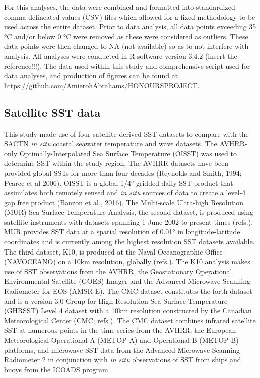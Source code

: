 \documentclass[12pt,A4paper,]{article}
\begin{document}
For this analyses, the data were combined and formatted into
standardized comma delineated values (CSV) files which allowed for a
fixed methodology to be used across the entire dataset. Prior to data
analysis, all data points exceeding 35 °C and/or below 0 °C were removed
as these were considered as outliers. These data points were then
changed to NA (not available) so as to not interfere with analysis. All
analyses were conducted in R software version 3.4.2 (insert the
reference!!!). The data used within this study and comprehensive script
used for data analyses, and production of figures can be found at
\url{https://github.com/AmierohAbrahams/HONOURSPROJECT}.

\subsection{Satellite SST data}\label{satellite-sst-data}

This study made use of four satellite-derived SST datasets to compare
with the SACTN \emph{in situ} coastal seawater temperature and wave
datasets. The AVHRR-only Optimally-Interpolated Sea Surface Temperature
(OISST) was used to determine SST within the study region. The AVHRR
datasets have been provided global SSTs for more than four decades
(Reynolds and Smith, 1994; Pearce et al 2006). OISST is a global 1/4°
gridded daily SST product that assimilates both remotely sensed and
\emph{in situ} sources of data to create a level-4 gap free product
(Banzon et al., 2016). The Multi-scale Ultra-high Resolution (MUR) Sea
Surface Temperature Analysis, the second dataset, is produced using
satellite instruments with datasets spanning 1 June 2002 to present
times (refs.). MUR provides SST data at a spatial resolution of 0.01° in
longitude-latitude coordinates and is currently among the highest
resolution SST datasets available. The third dataset, K10, is produced
at the Naval Oceanographic Office (NAVOCEANO) on a 10km resolution,
globally (refs.). The K10 analysis makes use of SST observations from
the AVHRR, the Geostationary Operational Environmental Satellite (GOES)
Imager and the Advanced Microwave Scanning Radiometer for EOS (AMSR-E).
The CMC dataset constitutes the forth dataset and is a version 3.0 Group
for High Resolution Sea Surface Temperature (GHRSST) Level 4 dataset
with a 10km resolution constructed by the Canadian Meteorological Center
(CMC; refs.). The CMC dataset combines infrared satellite SST at
numerous points in the time series from the AVHRR, the European
Meteorological Operational-A (METOP-A) and Operational-B (METOP-B)
platforms, and microwave SST data from the Advanced Microwave Scanning
Radiometer 2 in conjunction with \emph{in situ} observations of SST from
ships and buoys from the ICOADS program.
\end{document}

